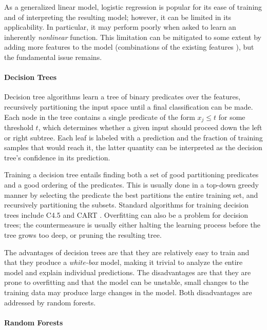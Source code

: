 As a generalized linear model, logistic regression is popular for its
ease of training and of interpreting the resulting model; however, it
can be limited in its applicability.
%
In particular, it may perform poorly when asked to learn an inherently
\emph{nonlinear} function.
%
This limitation can be mitigated to some extent by adding more features
to the model (\eg combinations of the existing features ), but
the fundamental issue remains.

\paragraph{Decision Trees}
Decision tree algorithms learn a tree of binary predicates over the
features, recursively partitioning the input space until a final
classification can be made.
%
Each node in the tree contains a single predicate of the form
$x_j \leq t$ for some threshold $t$, which determines whether a given
input should proceed down the left or right subtree.
%
Each leaf is labeled with a prediction and the fraction of training
samples that would reach it, the latter quantity can be interpreted as
the decision tree's confidence in its prediction.

Training a decision tree entails finding both a set of good partitioning
predicates and a good ordering of the predicates.
%
This is usually done in a top-down greedy manner by selecting the
predicate the best partitions the entire training set, and recursively
partitioning the subsets.
%
Standard algorithms for training decision trees include C4.5  and
CART .
%
Overfitting can also be a problem for decision trees; the countermeasure
is usually either halting the learning process before the tree grows too
deep, or pruning the resulting tree.

The advantages of decision trees are that they are relatively easy to
train and that they produce a \emph{white-box} model, making it trivial
to analyze the entire model and explain individual predictions.
%
The disadvantages are that they are prone to overfitting and that the
model can be unstable, \ie small changes to the training data may
produce large changes in the model.
%
Both disadvantages are addressed by random forests.

\paragraph{Random Forests}

